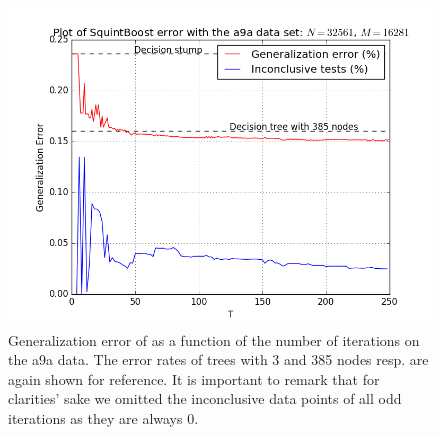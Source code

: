 \begin{figure}[!ht]
  \centering
    \includegraphics[width=\graphWidth]{generated/SQSVM.png}
  \caption{Generalization error of \squintB as a function of the number of iterations on the a9a data. The error rates of trees with 3 and 385 nodes resp. are again shown for reference. It is important to remark that for clarities' sake we omitted the inconclusive data points of all odd iterations as they are always 0.}
      \label{fig:SQSVM}
\end{figure}
\FloatBarrier



